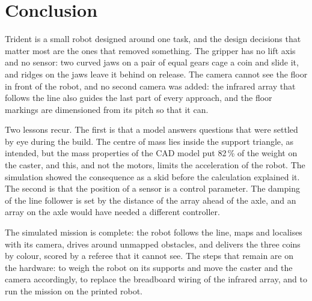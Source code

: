 \section{Conclusion}
\label{sec:conclusion}

Trident is a small robot designed around one task, and the design decisions that matter
most are the ones that removed something. The gripper has no lift axis and no sensor: two
curved jaws on a pair of equal gears cage a coin and slide it, and ridges on the jaws leave
it behind on release. The camera cannot see the floor in front of the robot, and no second
camera was added: the infrared array that follows the line also guides the last part of
every approach, and the floor markings are dimensioned from its pitch so that it can.

Two lessons recur. The first is that a model answers questions that were settled by eye
during the build. The centre of mass lies inside the support triangle, as intended, but the mass
properties of the CAD model put 82\,\% of the weight on the caster, and this, and not the
motors, limits the acceleration of the robot. The simulation showed the
consequence as a skid before the calculation explained it. The second is that the position
of a sensor is a control parameter. The damping of the line follower is set by the distance
of the array ahead of the axle, and an array on the axle would have needed a different
controller.

The simulated mission is complete: the robot follows the line, maps and localises with its
camera, drives around unmapped obstacles, and delivers the three coins by colour, scored by
a referee that it cannot see. The steps that remain are on the hardware: to weigh the robot
on its supports and move the caster and the camera accordingly, to replace the breadboard
wiring of the infrared array, and to run the mission on the printed robot.
